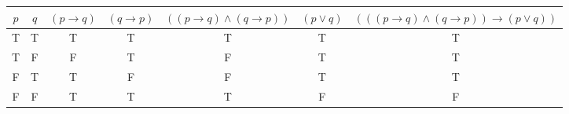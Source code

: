 \begin{tabular}{|c|c||c|c|c|c|c|}
\hline
$ p $ & $ q $ & $ (p \rightarrow q) $ & $ (q \rightarrow p) $ & $ ((p \rightarrow q) \wedge (q \rightarrow p)) $ & $ (p \vee q) $ & $ (((p \rightarrow q) \wedge (q \rightarrow p)) \rightarrow (p \vee q)) $ \\
\hline
T & T & T & T & T & T & T \\
T & F & F & T & F & T & T \\
F & T & T & F & F & T & T \\
F & F & T & T & T & F & F \\
\hline
\end{tabular}
